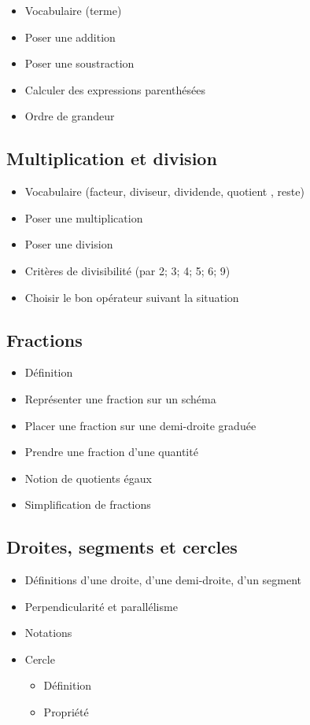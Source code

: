 \begin{itemize}
	\item Vocabulaire (terme)
	\item Poser une addition
	\item Poser une soustraction
	\item Calculer des expressions parenthésées 
	\item Ordre de grandeur
\end{itemize}


\subsection{Multiplication et division}

\begin{itemize}
	\item Vocabulaire (facteur, diviseur, dividende, quotient , reste)
	\item Poser une multiplication
	\item Poser une division
	\item Critères de divisibilité (par 2; 3; 4; 5; 6; 9)
	\item Choisir le bon opérateur suivant la situation
\end{itemize}


\subsection{Fractions}

\begin{itemize}
	\item Définition
	\item Représenter une fraction sur un schéma
	\item Placer une fraction sur une demi-droite graduée
	\item Prendre une fraction d'une quantité
	\item Notion de quotients égaux
	\item Simplification de fractions
\end{itemize}

\subsection{Droites, segments et cercles}

\begin{itemize}
	\item Définitions d'une droite, d'une demi-droite, d'un segment
	\item Perpendicularité et parallélisme
	\item Notations
	\item Cercle
		\begin{itemize}
			\item Définition
			\item Propriété
		\end{itemize}
\end{itemize}

